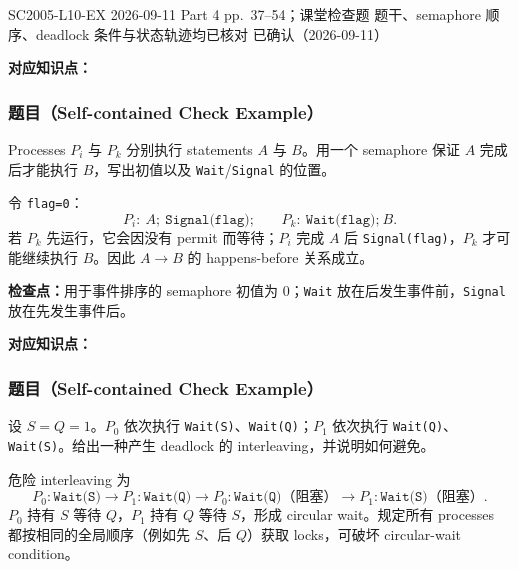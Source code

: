 

\examplemeta
  {SC2005-L10-EX}
  {2026-09-11}
  {Part 4 pp.~37--54；课堂检查题}
  {题干、semaphore 顺序、deadlock 条件与状态轨迹均已核对}
  {已确认（2026-09-11）}


\textbf{对应知识点：}

\subsubsection*{题目（Self-contained Check Example）}

Processes $P_i$ 与 $P_k$ 分别执行 statements $A$ 与 $B$。用一个 semaphore 保证 $A$ 完成后才能执行 $B$，写出初值以及 \texttt{Wait}/\texttt{Signal} 的位置。

\begin{checkedsolution}
令 \texttt{flag=0}：
\[
  P_i:\ A;\ \texttt{Signal(flag);}
  \qquad
  P_k:\ \texttt{Wait(flag);}\ B.
\]
若 $P_k$ 先运行，它会因没有 permit 而等待；$P_i$ 完成 $A$ 后 \texttt{Signal(flag)}，$P_k$ 才可能继续执行 $B$。因此 $A\rightarrow B$ 的 happens-before 关系成立。
\end{checkedsolution}

\textbf{检查点：}用于事件排序的 semaphore 初值为 $0$；\texttt{Wait} 放在后发生事件前，\texttt{Signal} 放在先发生事件后。


\textbf{对应知识点：}

\subsubsection*{题目（Self-contained Check Example）}

设 $S=Q=1$。$P_0$ 依次执行 \texttt{Wait(S)}、\texttt{Wait(Q)}；$P_1$ 依次执行 \texttt{Wait(Q)}、\texttt{Wait(S)}。给出一种产生 deadlock 的 interleaving，并说明如何避免。

\begin{checkedsolution}
危险 interleaving 为
\[
  P_0:\texttt{Wait(S)}
  \rightarrow P_1:\texttt{Wait(Q)}
  \rightarrow P_0:\texttt{Wait(Q)}\text{（阻塞）}
  \rightarrow P_1:\texttt{Wait(S)}\text{（阻塞）}.
\]
$P_0$ 持有 $S$ 等待 $Q$，$P_1$ 持有 $Q$ 等待 $S$，形成 circular wait。规定所有 processes 都按相同的全局顺序（例如先 $S$、后 $Q$）获取 locks，可破坏 circular-wait condition。
\end{checkedsolution}

